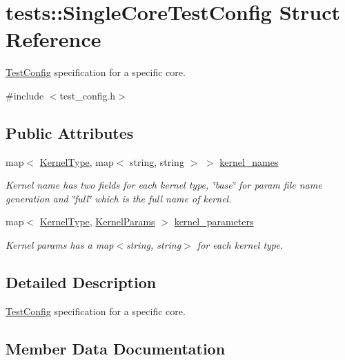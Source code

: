 \hypertarget{structtests_1_1SingleCoreTestConfig}{}\section{tests\+:\+:Single\+Core\+Test\+Config Struct Reference}
\label{structtests_1_1SingleCoreTestConfig}


\hyperlink{structtests_1_1TestConfig}{Test\+Config} specification for a specific core.  




{\ttfamily \#include $<$test\+\_\+config.\+h$>$}

\subsection*{Public Attributes}
\begin{DoxyCompactItemize}
\item 
map$<$ \hyperlink{namespacetests_a4f360b8af533762256ff97513bfd6a0d}{Kernel\+Type}, map$<$ string, string $>$ $>$ \hyperlink{structtests_1_1SingleCoreTestConfig_a58d9652e2888f2a8fd20d1df5419f91e}{kernel\+\_\+names}
\begin{DoxyCompactList}\small\item\em Kernel name has two fields for each kernel type, \char`\"{}base\char`\"{} for param file name generation and \char`\"{}full\char`\"{} which is the full name of kernel. \end{DoxyCompactList}\item 
map$<$ \hyperlink{namespacetests_a4f360b8af533762256ff97513bfd6a0d}{Kernel\+Type}, \hyperlink{structtests_1_1KernelParams}{Kernel\+Params} $>$ \hyperlink{structtests_1_1SingleCoreTestConfig_a7d92aead3b33ee501ebce274d164e8df}{kernel\+\_\+parameters}
\begin{DoxyCompactList}\small\item\em Kernel params has a map$<$string, string$>$ for each kernel type. \end{DoxyCompactList}\end{DoxyCompactItemize}


\subsection{Detailed Description}
\hyperlink{structtests_1_1TestConfig}{Test\+Config} specification for a specific core. 

\subsection{Member Data Documentation}
\mbox{\label{structtests_1_1SingleCoreTestConfig_a58d9652e2888f2a8fd20d1df5419f91e}} 
